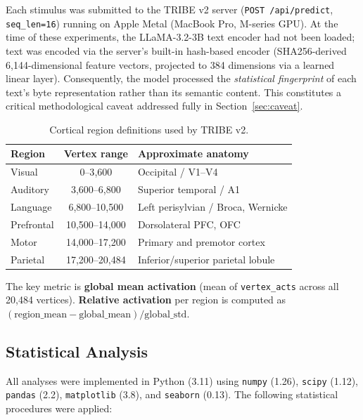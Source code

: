 \documentclass[11pt,letterpaper]{article}
\numberwithin{equation}{section}
\begin{document}
Each stimulus was submitted to the TRIBE v2 server (\texttt{POST /api/predict}, \texttt{seq\_len=16}) running on Apple Metal (MacBook Pro, M-series GPU). At the time of these experiments, the LLaMA-3.2-3B text encoder had not been loaded; text was encoded via the server's built-in hash-based encoder (SHA256-derived 6{,}144-dimensional feature vectors, projected to 384 dimensions via a learned linear layer). Consequently, the model processed the \textit{statistical fingerprint} of each text's byte representation rather than its semantic content. This constitutes a critical methodological caveat addressed fully in Section~\ref{sec:caveat}.

\begin{table}[ht]
\centering
\small
\caption{Cortical region definitions used by TRIBE v2.}
\label{tab:regions}
\begin{tabular}{l c l}
\toprule
\textbf{Region} & \textbf{Vertex range} & \textbf{Approximate anatomy} \\
\midrule
Visual     & 0--3{,}600       & Occipital / V1--V4 \\
Auditory   & 3{,}600--6{,}800  & Superior temporal / A1 \\
Language   & 6{,}800--10{,}500 & Left perisylvian / Broca, Wernicke \\
Prefrontal & 10{,}500--14{,}000 & Dorsolateral PFC, OFC \\
Motor      & 14{,}000--17{,}200 & Primary and premotor cortex \\
Parietal   & 17{,}200--20{,}484 & Inferior/superior parietal lobule \\
\bottomrule
\end{tabular}
\end{table}

The key metric is \textbf{global mean activation} (mean of \texttt{vertex\_acts} across all 20{,}484 vertices). \textbf{Relative activation} per region is computed as $(\mathrm{region\_mean} - \mathrm{global\_mean}) / \mathrm{global\_std}$.

\subsection{Statistical Analysis}

All analyses were implemented in Python (3.11) using \texttt{numpy} (1.26), \texttt{scipy} (1.12), \texttt{pandas} (2.2), \texttt{matplotlib} (3.8), and \texttt{seaborn} (0.13). The following statistical procedures were applied:
\end{document}

